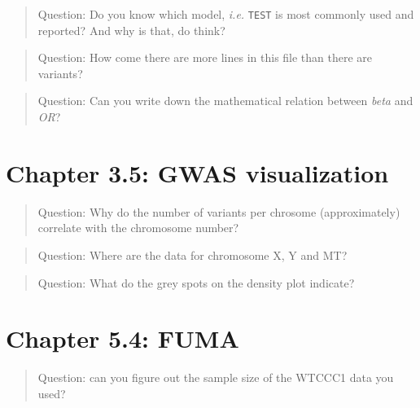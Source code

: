 \documentclass[
]{book}
\newcommand{\passthrough}[1]{#1}
\begin{document}
\begin{quote}
Question: Do you know which model, \emph{i.e.} \passthrough{\lstinline!TEST!} is most commonly used and reported? And why is that, do think?
\end{quote}

\begin{quote}
Question: How come there are more lines in this file than there are variants?
\end{quote}

\begin{quote}
Question: Can you write down the mathematical relation between \emph{beta} and \emph{OR}?
\end{quote}

\hypertarget{chapter-3.5-gwas-visualization}{%
\section{Chapter 3.5: GWAS visualization}\label{chapter-3.5-gwas-visualization}}

\begin{quote}
Question: Why do the number of variants per chrosome (approximately) correlate with the chromosome number?
\end{quote}

\begin{quote}
Question: Where are the data for chromosome X, Y and MT?
\end{quote}

\begin{quote}
Question: What do the grey spots on the density plot indicate?
\end{quote}

\hypertarget{chapter-5.4-fuma}{%
\section{Chapter 5.4: FUMA}\label{chapter-5.4-fuma}}

\begin{quote}
Question: can you figure out the sample size of the WTCCC1 data you used?
\end{quote}
\end{document}
